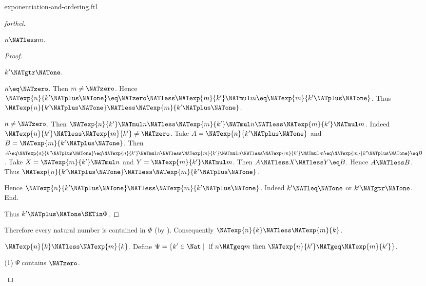 \documentclass{stex}
\begin{document}
\begin{smodule}{exponentiation-and-ordering.ftl}
\begin{proof}[forthel]
\begin{case}{$n \NATless m$.}
\begin{proof}
        \begin{case}{$k' \NATgtr \NATone$.}
          \begin{case}{$n \eq \NATzero$.}
            Then $m \neq \NATzero$.
            Hence $\NATexp{n}{k' \NATplus \NATone}
              \eq \NATzero
              \NATless \NATexp{m}{k'} \NATmul m
              \eq \NATexp{m}{k' \NATplus \NATone}$.
            Thus $\NATexp{n}{k' \NATplus \NATone} \NATless \NATexp{m}{k' \NATplus \NATone}$.
          \end{case}

          \begin{case}{$n \neq \NATzero$.}
            Then $\NATexp{n}{k'} \NATmul n
              \NATless \NATexp{m}{k'} \NATmul n
              \NATless \NATexp{m}{k'} \NATmul m$.
            Indeed $\NATexp{n}{k'} \NATless \NATexp{m}{k'} \neq \NATzero$.
            Take $A = \NATexp{n}{k' \NATplus \NATone}$ and $B = \NATexp{m}{k' \NATplus \NATone}$. %
            Then $A
              \eq \NATexp{n}{k' \NATplus \NATone}
              \eq \NATexp{n}{k'} \NATmul n
              \NATless \NATexp{m}{k'} \NATmul n
              \NATless \NATexp{m}{k'} \NATmul m
              \eq \NATexp{m}{k' \NATplus \NATone}
              \eq B$.
            Take $X = \NATexp{m}{k'} \NATmul n$ and $Y = \NATexp{m}{k'} \NATmul m$.
            Then $A \NATless X \NATless Y \eq B$.
            Hence $A \NATless B$.
            Thus $\NATexp{n}{k' \NATplus \NATone} \NATless \NATexp{m}{k' \NATplus \NATone}$.
          \end{case}
        \end{case}

        Hence $\NATexp{n}{k' \NATplus \NATone} \NATless \NATexp{m}{k' \NATplus \NATone}$.
        Indeed $k' \NATleq \NATone$ or $k' \NATgtr \NATone$.
      End.

      Thus $k' \NATplus \NATone \SETin \Phi$.
    \end{proof}

    Therefore every natural number is contained in $\Phi$ (by ).
    Consequently $\NATexp{n}{k} \NATless \NATexp{m}{k}$.
  \end{case}

  \begin{case}{$\NATexp{n}{k} \NATless \NATexp{m}{k}$.}
    Define $\Psi = \{ k' \in \Nat \mid\text{ if }n \NATgeq m\text{ then }\NATexp{n}{k'} \NATgeq \NATexp{m}{k'} \}$.

    (1) $\Psi$ contains $\NATzero$.


\end{case}
\end{proof}
\end{smodule}
\end{document}
